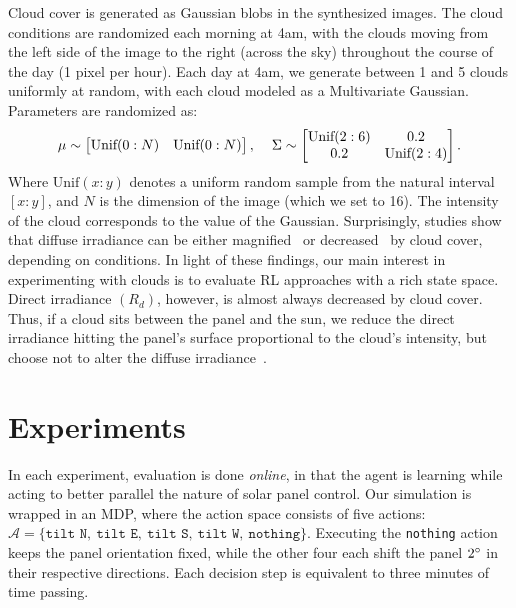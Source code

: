 \documentclass{article}
\newcommand{\mc}{\mathcal}
\begin{document}
Cloud cover is generated as Gaussian blobs in the synthesized images. The cloud conditions are randomized each morning at 4am, with the clouds moving from the left side of the image to the right (across the sky) throughout the course of the day (1 pixel per hour). Each day at 4am, we generate between 1 and 5 clouds uniformly at random, with each cloud modeled as a Multivariate Gaussian. Parameters are randomized as:
\begin{align}
\mu \sim \begin{bmatrix}
\text{Unif}(0:N)&  \text{Unif}(0:N) \\
\end{bmatrix}, \hspace{4mm}
\Sigma \sim \begin{bmatrix}
\text{Unif}(2:6)&0.2 \\
0.2&\text{Unif}(2:4) \\
\end{bmatrix}.
\end{align}
Where $\text{Unif}(x:y)$ denotes a uniform random sample from the natural interval $[x:y]$, and $N$ is the dimension of the image (which we set to 16). The intensity of the cloud corresponds to the value of the Gaussian. Surprisingly, studies show that diffuse irradiance can be either magnified~\cite{robinson1966solar} or decreased~\cite{pfister2003cloud} by cloud cover, depending on conditions. In light of these findings, our main interest in experimenting with clouds is to evaluate RL approaches with a rich state space. Direct irradiance $(R_d)$, however, is almost always decreased by cloud cover. Thus, if a cloud sits between the panel and the sun, we reduce the direct irradiance hitting the panel's surface proportional to the cloud's intensity, but choose not to alter the diffuse irradiance~\cite{robinson1966solar,pfister2003cloud}. %



\section{Experiments}

In each experiment, evaluation is done {\it online}, in that the agent is learning while acting to better parallel the nature of solar panel control. Our simulation is wrapped in an MDP, where the action space consists of five actions: $\mc{A} = \{\texttt{tilt N},\ \texttt{tilt E},\ \texttt{tilt S},\ \texttt{tilt W},\ \texttt{nothing}\}$. Executing the \texttt{nothing} action keeps the panel orientation fixed, while the other four each shift the panel $2\degree$ in their respective directions. Each decision step is equivalent to three minutes of time passing.
\end{document}
